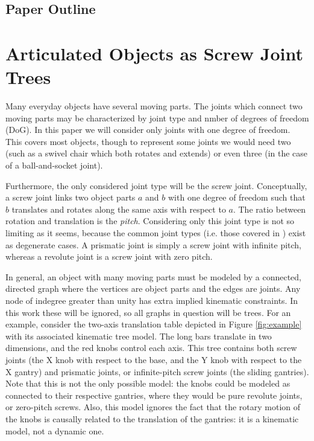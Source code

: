 \documentclass{article} %
\begin{document}
\subsection{Paper Outline}

\section{Articulated Objects as Screw Joint Trees}
Many everyday objects have several moving parts. The joints which connect two moving parts may be characterized by joint type and nmber of degrees of freedom (DoG). In this paper we will consider only joints with one degree of freedom. This covers most objects, though to represent some joints we would need two (such as a swivel chair which both rotates and extends) or even three (in the case of a ball-and-socket joint).

Furthermore, the only considered joint type will be the screw joint. Conceptually, a screw joint links two object parts $a$ and $b$ with one degree of freedom such that $b$ translates and rotates along the same axis with respect to $a$. The ratio between rotation and translation is the \emph{pitch}. Considering only this joint type is not so limiting as it seems, because the common joint types (i.e. those covered in \cite{Burka2013}) exist as degenerate cases. A prismatic joint is simply a screw joint with infinite pitch, whereas a revolute joint is a screw joint with zero pitch.

In general, an object with many moving parts must be modeled by a connected, directed graph where the vertices are object parts and the edges are joints.  Any node of indegree greater than unity has extra implied kinematic constraints. In this work these will be ignored, so all graphs in question will be trees. For an example, consider the two-axis translation table depicted in Figure \ref{fig:example} with its associated kinematic tree model. The long bars translate in two dimensions, and the red knobs control each axis. This tree contains both screw joints (the X knob with respect to the base, and the Y knob with respect to the X gantry) and prismatic joints, or infinite-pitch screw joints (the sliding gantries). Note that this is not the only possible model: the knobs could be modeled as connected to their respective gantries, where they would be pure revolute joints, or zero-pitch screws. Also, this model ignores the fact that the rotary motion of the knobs is causally related to the translation of the gantries: it is a kinematic model, not a dynamic one.
\end{document}
